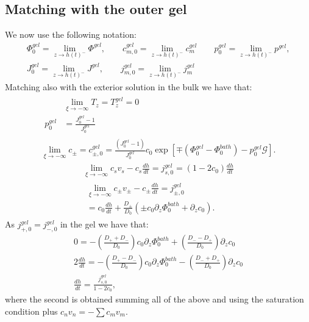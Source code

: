 \documentclass[12pt]{extarticle}
\begin{document}
\subsection{Matching with the outer gel}
We now use the following notation:
\begin{equation}
\begin{aligned}
\Phi^{gel}_0=\lim_{z\rightarrow h(t)^-} \Phi^{gel}, \qquad c^{gel}_{m,0}=\lim_{z\rightarrow h(t)^-} c^{gel}_{m} \qquad p_0^{gel}=\lim_{z\rightarrow h(t)^-} p^{gel},\\
J^{gel}_0=\lim_{z\rightarrow h(t)^-} J^{gel}, \qquad j^{gel}_{m,0}=\lim_{z\rightarrow h(t)^-} j^{gel}_m
\end{aligned}
\end{equation}
Matching also with the exterior solution in the bulk we have that:
\begin{gather}
\begin{aligned}
&\lim_{\xi\rightarrow -\infty} T_z = T^{gel}_z =0 \\
p^{gel}_0& = \frac{J^{gel}_0-1}{J^{gel}_0}\label{eq1}
\end{aligned}\\
\lim_{\xi\rightarrow -\infty} c_\pm = c^{gel}_{\pm,0} = \frac{(J^{gel}_0-1)}{J^{gel}_0}c_0\exp[\mp(\Phi^{gel}_0-\Phi_0^{bath})-p_0^{gel}\mathcal{G}].
\end{gather}
\begin{gather}
\lim_{\xi\rightarrow -\infty} c_s v_s - c_s \frac{dh}{dt}= j^{gel}_{s,0} =(1-2c_0)\frac{dh}{dt}\\
\begin{aligned}
\lim_{\xi\rightarrow -\infty}c_\pm v_\pm - c_\pm \frac{dh}{dt}=j^{gel}_{\pm,0}\\
=c_0 \frac{dh}{dt}  +\frac{D_\pm}{D_0}\left(\pm c_0 \partial_z \Phi^{bath}_0+\partial_z c_0\right).
\end{aligned}
\end{gather}
As $j^{gel}_{+,0}=j^{gel}_{-,0}$ in the gel we have that:
\begin{eqnarray}
0= - \left(\frac{D_++D_-}{D_0}\right)c_0\partial_z \Phi^{bath}_0 + \left(\frac{D_--D_+}{D_0}\right)\partial_z c_0\label{A}\\
2 \frac{d h}{dt} =- \left(\frac{D_+-D_-}{D_0}\right)c_0\partial_z \Phi^{bath}_0 - \left(\frac{D_-+D_+}{D_0}\right)\partial_z c_0\label{B}\\
\frac{d h}{dt} = \frac{j_{s,0}^{gel}}{1-2c_0},
\end{eqnarray}
where the second is obtained summing all of the above and using the saturation condition plus $c_nv_n=-\sum c_mv_m$. 
\end{document}
